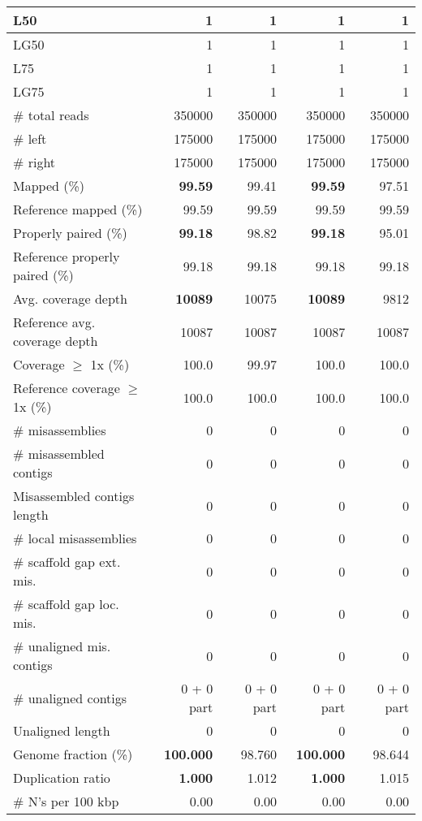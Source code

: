 \documentclass[12pt,a4paper]{article}
\begin{document}
\begin{table}[ht]
\begin{center}
\begin{tabular}{|l*{4}{|r}|}
L50 & 1 & 1 & 1 & 1 \\ \hline
LG50 & 1 & 1 & 1 & 1 \\ \hline
L75 & 1 & 1 & 1 & 1 \\ \hline
LG75 & 1 & 1 & 1 & 1 \\ \hline
\# total reads & 350000 & 350000 & 350000 & 350000 \\ \hline
\# left & 175000 & 175000 & 175000 & 175000 \\ \hline
\# right & 175000 & 175000 & 175000 & 175000 \\ \hline
Mapped (\%) & {\bf 99.59} & 99.41 & {\bf 99.59} & 97.51 \\ \hline
Reference mapped (\%) & 99.59 & 99.59 & 99.59 & 99.59 \\ \hline
Properly paired (\%) & {\bf 99.18} & 98.82 & {\bf 99.18} & 95.01 \\ \hline
Reference properly paired (\%) & 99.18 & 99.18 & 99.18 & 99.18 \\ \hline
Avg. coverage depth & {\bf 10089} & 10075 & {\bf 10089} & 9812 \\ \hline
Reference avg. coverage depth & 10087 & 10087 & 10087 & 10087 \\ \hline
Coverage $\geq$ 1x (\%) & 100.0 & 99.97 & 100.0 & 100.0 \\ \hline
Reference coverage $\geq$ 1x (\%) & 100.0 & 100.0 & 100.0 & 100.0 \\ \hline
\# misassemblies & 0 & 0 & 0 & 0 \\ \hline
\# misassembled contigs & 0 & 0 & 0 & 0 \\ \hline
Misassembled contigs length & 0 & 0 & 0 & 0 \\ \hline
\# local misassemblies & 0 & 0 & 0 & 0 \\ \hline
\# scaffold gap ext. mis. & 0 & 0 & 0 & 0 \\ \hline
\# scaffold gap loc. mis. & 0 & 0 & 0 & 0 \\ \hline
\# unaligned mis. contigs & 0 & 0 & 0 & 0 \\ \hline
\# unaligned contigs & 0 + 0 part & 0 + 0 part & 0 + 0 part & 0 + 0 part \\ \hline
Unaligned length & 0 & 0 & 0 & 0 \\ \hline
Genome fraction (\%) & {\bf 100.000} & 98.760 & {\bf 100.000} & 98.644 \\ \hline
Duplication ratio & {\bf 1.000} & 1.012 & {\bf 1.000} & 1.015 \\ \hline
\# N's per 100 kbp & 0.00 & 0.00 & 0.00 & 0.00 \\ \hline

\end{tabular}
\end{center}
\end{table}
\end{document}
